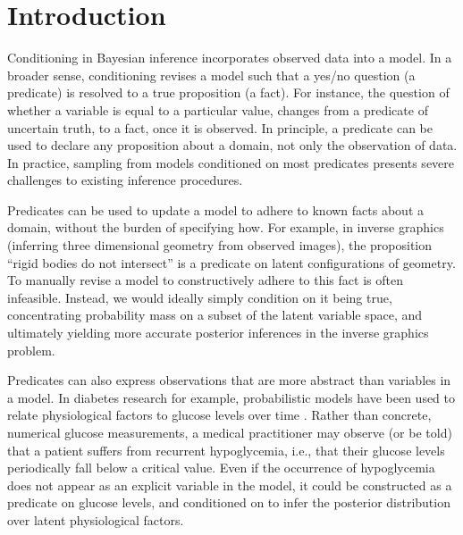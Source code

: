 
\section{Introduction}

Conditioning in Bayesian inference incorporates observed data into a model.
In a broader sense, conditioning revises a model such that a yes/no question (a predicate) is resolved to a true proposition (a fact).
For instance, the question of whether a variable is equal to a particular value, changes from a predicate of uncertain truth, to a fact, once it is observed.
In principle, a predicate can be used to declare any proposition about a domain, not only the observation of data.
In practice, sampling from models conditioned on most predicates presents severe challenges to existing inference procedures.

Predicates can be used to update a model to adhere to known facts about a domain, without the burden of specifying how.
For example, in inverse graphics \cite{marschner1998inverse,kulkarni2015deep} (inferring three dimensional geometry from observed images), the proposition ``rigid bodies do not intersect'' is a predicate on latent configurations of geometry.
To manually revise a model to constructively adhere to this fact is often infeasible.
Instead, we would ideally simply condition on it being true, concentrating probability mass on a subset of the latent variable space, and ultimately yielding more accurate posterior inferences in the inverse graphics problem.

Predicates can also express observations that are more abstract than variables in a model.
In diabetes research for example, probabilistic models have been used to relate physiological factors to glucose levels over time \citep{levine2017offline,murata2004probabilistic}.
Rather than concrete, numerical glucose measurements, a medical practitioner may observe (or be told) that a patient suffers from recurrent hypoglycemia, i.e., that their glucose levels periodically fall below a critical value.
Even if the occurrence of hypoglycemia does not appear as an explicit variable in the model, it could be constructed as a predicate on glucose levels, and conditioned on to infer the posterior distribution over latent physiological factors.




